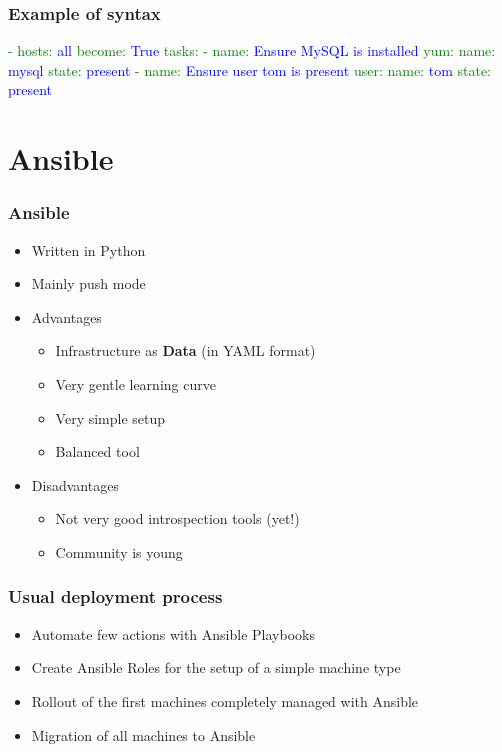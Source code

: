\documentclass[t,aspectratio=169]{beamer}
\begin{document}
\begin{frame}[fragile]
    \frametitle{Example of syntax}
    \begin{semiverbatim}
\textcolor{green}{- hosts:} \textcolor{blue}{all}
\textcolor{green}{  become:} \textcolor{blue}{True}
\textcolor{green}{  tasks:}
\textcolor{green}{  - name:} \textcolor{blue}{Ensure MySQL is installed}
\textcolor{green}{    yum:}
\textcolor{green}{      name:} \textcolor{blue}{mysql}
\textcolor{green}{      state:} \textcolor{blue}{present}
\textcolor{green}{  - name:} \textcolor{blue}{Ensure user tom is present}
\textcolor{green}{    user:}
\textcolor{green}{      name:} \textcolor{blue}{tom}
\textcolor{green}{      state:} \textcolor{blue}{present}
    \end{semiverbatim}
\end{frame}

\section{Ansible}
\begin{frame}
    \frametitle{Ansible}
    \begin{itemize}
        \item<2-> Written in Python
        \item<3-> Mainly push mode
        \item<4-> Advantages
        \begin{itemize}
            \item<5-> Infrastructure as \textbf{Data} (in YAML format)
            \item<6-> Very gentle learning curve
            \item<7-> Very simple setup
            \item<8-> Balanced tool
        \end{itemize}
        \item<9-> Disadvantages
        \begin{itemize}
            \item<10-> Not very good introspection tools (yet!)
            \item<11-> Community is young
        \end{itemize}
    \end{itemize}
\end{frame}

\begin{frame}
    \frametitle{Usual deployment process}
    \begin{itemize}
        \item<2-> Automate few actions with Ansible Playbooks
        \item<3-> Create Ansible Roles for the setup of a simple machine type
        \item<4-> Rollout of the first machines completely managed with Ansible
        \item<5-> Migration of all machines to Ansible
    \end{itemize}
\end{frame}
\end{document}

